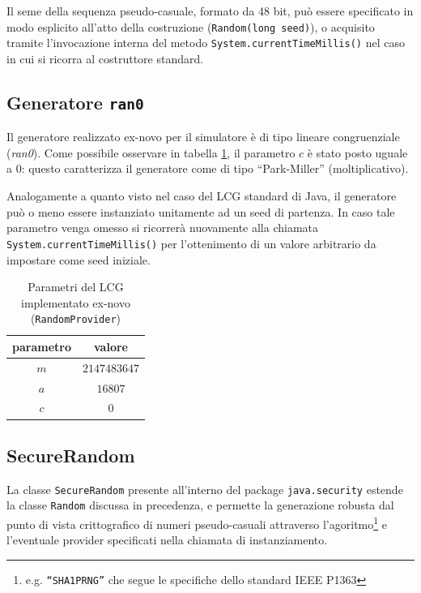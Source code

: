 Il seme della sequenza pseudo-casuale, formato da 48 bit, pu\`o essere specificato in modo esplicito all'atto della costruzione ({\tt Random(long seed)}), o acquisito tramite l'invocazione interna del metodo {\tt System.currentTimeMillis()} nel caso in cui si ricorra al costruttore standard.

\subsection{Generatore {\tt ran0}}

Il generatore realizzato ex-novo per il simulatore \`e di tipo lineare congruenziale (\emph{ran0}). Come possibile osservare in tabella \ref{tab:rndcustom}, il parametro $c$ \`e stato posto uguale a $0$: questo caratterizza il generatore come di tipo ``Park-Miller'' (moltiplicativo).

Analogamente a quanto visto nel caso del LCG standard di Java, il generatore pu\`o o meno essere instanziato unitamente ad un seed di partenza. In caso tale parametro venga omesso si ricorrer\`a nuovamente alla chiamata 
{\tt System.currentTimeMillis()} per l'ottenimento di un valore arbitrario da impostare come seed iniziale.

\begin{table}[!h]
	\begin{center}
	\begin{tabular}{c|c}
	parametro & valore\\
	\hline
	$m$ & $2147483647$  \\
	$a$ & $16807$  \\
	$c$ & $0$  \\
	\end{tabular}
	\end{center}
	\caption{Parametri del LCG implementato ex-novo ({\tt RandomProvider})}
	\label{tab:rndcustom}
\end{table}

\subsection{SecureRandom}

La classe {\tt SecureRandom} presente all'interno del package {\tt java.security} estende la classe {\tt Random} discussa in precedenza, e permette la generazione robusta dal punto di vista crittografico di numeri pseudo-casuali attraverso l'agoritmo\footnote{e.g. {\tt ``SHA1PRNG''} che segue le specifiche dello standard IEEE P1363} e l'eventuale provider specificati nella chiamata di instanziamento.

